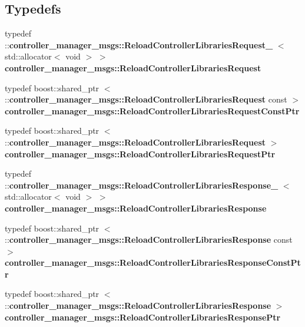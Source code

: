 \subsection*{\-Typedefs}
\begin{DoxyCompactItemize}
\item 
typedef \*
\-::{\bf controller\-\_\-manager\-\_\-msgs\-::\-Reload\-Controller\-Libraries\-Request\-\_\-}\*
$<$ std\-::allocator$<$ void $>$ $>$ {\bf controller\-\_\-manager\-\_\-msgs\-::\-Reload\-Controller\-Libraries\-Request}
\item 
typedef boost\-::shared\-\_\-ptr\*
$<$ \-::{\bf controller\-\_\-manager\-\_\-msgs\-::\-Reload\-Controller\-Libraries\-Request} \*
const  $>$ {\bf controller\-\_\-manager\-\_\-msgs\-::\-Reload\-Controller\-Libraries\-Request\-Const\-Ptr}
\item 
typedef boost\-::shared\-\_\-ptr\*
$<$ \-::{\bf controller\-\_\-manager\-\_\-msgs\-::\-Reload\-Controller\-Libraries\-Request} $>$ {\bf controller\-\_\-manager\-\_\-msgs\-::\-Reload\-Controller\-Libraries\-Request\-Ptr}
\item 
typedef \*
\-::{\bf controller\-\_\-manager\-\_\-msgs\-::\-Reload\-Controller\-Libraries\-Response\-\_\-}\*
$<$ std\-::allocator$<$ void $>$ $>$ {\bf controller\-\_\-manager\-\_\-msgs\-::\-Reload\-Controller\-Libraries\-Response}
\item 
typedef boost\-::shared\-\_\-ptr\*
$<$ \-::{\bf controller\-\_\-manager\-\_\-msgs\-::\-Reload\-Controller\-Libraries\-Response} \*
const  $>$ {\bf controller\-\_\-manager\-\_\-msgs\-::\-Reload\-Controller\-Libraries\-Response\-Const\-Ptr}
\item 
typedef boost\-::shared\-\_\-ptr\*
$<$ \-::{\bf controller\-\_\-manager\-\_\-msgs\-::\-Reload\-Controller\-Libraries\-Response} $>$ {\bf controller\-\_\-manager\-\_\-msgs\-::\-Reload\-Controller\-Libraries\-Response\-Ptr}
\end{DoxyCompactItemize}
